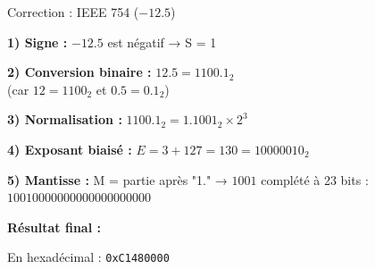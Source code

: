 \documentclass[aspectratio=1610]{beamer}
\begin{document}
\begin{frame}{Correction : IEEE 754 ($-12.5$)}

  \textbf{1) Signe :} $-12.5$ est négatif → S = 1

  \vspace{0.2cm}

  \textbf{2) Conversion binaire :} $12.5 = 1100.1_2$ \\
  (car $12 = 1100_2$ et $0.5 = 0.1_2$)

  \vspace{0.2cm}

  \textbf{3) Normalisation :} $1100.1_2 = 1.1001_2 \times 2^3$

  \vspace{0.2cm}

  \textbf{4) Exposant biaisé :} $E = 3 + 127 = 130 = 10000010_2$

  \vspace{0.2cm}

  \textbf{5) Mantisse :} M = partie après "1." → $1001$ complété à 23 bits : \\
  $10010000000000000000000$

  \vspace{0.3cm}

  \textbf{Résultat final :}

  \begin{center}
  \end{center}

  En hexadécimal : \texttt{0xC1480000}

\end{frame}
\end{document}
